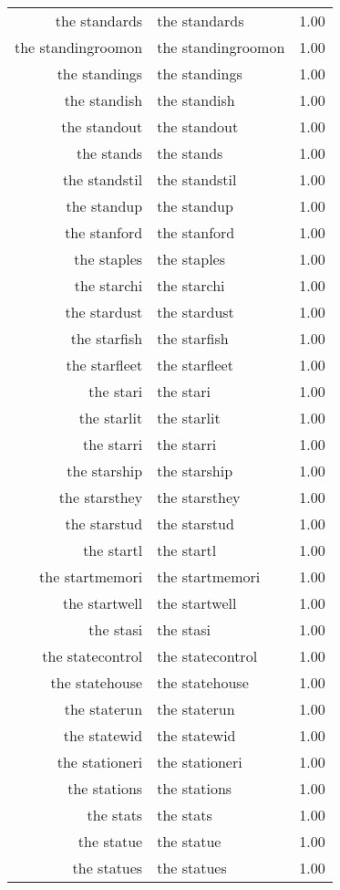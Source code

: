 \begin{table}[ht]
\begin{tabular}{rlr}
  the standards & the standards & 1.00 \\ 
  the standingroomon & the standingroomon & 1.00 \\ 
  the standings & the standings & 1.00 \\ 
  the standish & the standish & 1.00 \\ 
  the standout & the standout & 1.00 \\ 
  the stands & the stands & 1.00 \\ 
  the standstil & the standstil & 1.00 \\ 
  the standup & the standup & 1.00 \\ 
  the stanford & the stanford & 1.00 \\ 
  the staples & the staples & 1.00 \\ 
  the starchi & the starchi & 1.00 \\ 
  the stardust & the stardust & 1.00 \\ 
  the starfish & the starfish & 1.00 \\ 
  the starfleet & the starfleet & 1.00 \\ 
  the stari & the stari & 1.00 \\ 
  the starlit & the starlit & 1.00 \\ 
  the starri & the starri & 1.00 \\ 
  the starship & the starship & 1.00 \\ 
  the starsthey & the starsthey & 1.00 \\ 
  the starstud & the starstud & 1.00 \\ 
  the startl & the startl & 1.00 \\ 
  the startmemori & the startmemori & 1.00 \\ 
  the startwell & the startwell & 1.00 \\ 
  the stasi & the stasi & 1.00 \\ 
  the statecontrol & the statecontrol & 1.00 \\ 
  the statehouse & the statehouse & 1.00 \\ 
  the staterun & the staterun & 1.00 \\ 
  the statewid & the statewid & 1.00 \\ 
  the stationeri & the stationeri & 1.00 \\ 
  the stations & the stations & 1.00 \\ 
  the stats & the stats & 1.00 \\ 
  the statue & the statue & 1.00 \\ 
  the statues & the statues & 1.00 \\ 

\end{tabular}
\end{table}
